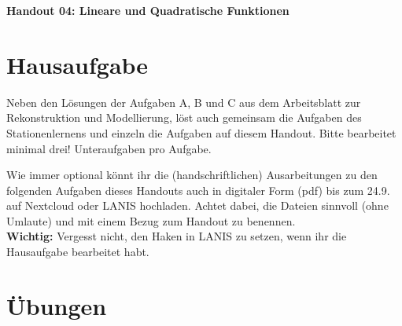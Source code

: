 \documentclass[a4paper,ngerman,12pt]{exam}
\begin{document}
\vspace*{0.3cm}
\begin{center}
    \huge\bfseries Handout 04: Lineare und Quadratische Funktionen
\end{center}

\section*{Hausaufgabe}

\par Neben den Lösungen der Aufgaben A, B und C aus dem Arbeitsblatt zur Rekonstruktion und Modellierung, löst auch gemeinsam die Aufgaben des Stationenlernens und einzeln die Aufgaben auf diesem Handout. Bitte bearbeitet minimal drei! Unteraufgaben pro Aufgabe.

\par Wie immer optional könnt ihr die (handschriftlichen) Ausarbeitungen zu den folgenden Aufgaben dieses Handouts auch in digitaler Form (pdf) bis zum 24.9. auf Nextcloud oder LANIS hochladen. Achtet dabei, die Dateien sinnvoll (ohne Umlaute) und mit einem Bezug zum Handout zu benennen.\\ \textbf{Wichtig:} Vergesst nicht, den Haken in LANIS zu setzen, wenn ihr die Hausaufgabe bearbeitet habt.

\section*{Übungen}
\end{document}
